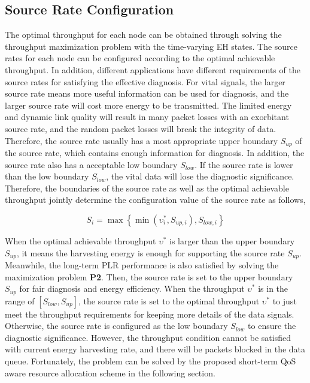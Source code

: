 \documentclass[journal,10pt]{IEEEtran}
\begin{document}
\subsection{Source Rate Configuration}
The optimal throughput for each node can be obtained through solving the throughput maximization problem with the time-varying EH states. The source rates for each node can be configured according to the optimal achievable throughput. 
In addition, different applications have different requirements of the source rates for satisfying the effective diagnosis. 
For vital signals, the larger source rate means more useful information can be used for diagnosis, and the larger source rate will cost more energy to be transmitted. 
The limited energy and dynamic link quality will result in many packet losses with an exorbitant source rate, and the random packet losses will break the integrity of data. Therefore, the source rate usually has a most appropriate upper boundary $S_{up}$ of the source rate, which contains enough information for diagnosis.
In addition, the source rate also has a acceptable low boundary $S_{low}$. If the source rate is lower than the low boundary $S_{low}$, the vital data will lose the diagnostic significance. 
Therefore, the boundaries of the source rate as well as the optimal achievable throughput jointly determine the configuration value of the source rate as follows,

\begin{equation}
S_{i} = \max \left\{ \min (\upsilon_{i}^{*}, S_{up,i} ), S_{low,i} \right\}
\end{equation}

When the optimal achievable throughput $\upsilon^{*}$ is larger than the upper boundary $S_{up}$, it means the harvesting energy is enough for supporting the source rate $S_{up}$. Meanwhile, the long-term PLR performance is also satisfied by solving the maximization problem \textbf{P2}. 
Then, the source rate is set to the upper boundary $S_{up}$ for fair diagnosis and energy efficiency. 
When the throughput $\upsilon^{*}$ is in the range of $[S_{low},S_{up}]$, the source rate is set to the optimal throughput $\upsilon^{*}$ to just meet the throughput requirements for keeping more details of the data signals. Otherwise, the source rate is configured as the low boundary $S_{low}$ to ensure the diagnostic significance.
However, the throughput condition cannot be satisfied with current energy harvesting rate, and there will be packets blocked in the data queue. Fortunately, the problem can be solved by the proposed short-term QoS aware resource allocation scheme in the following section.
\end{document}

